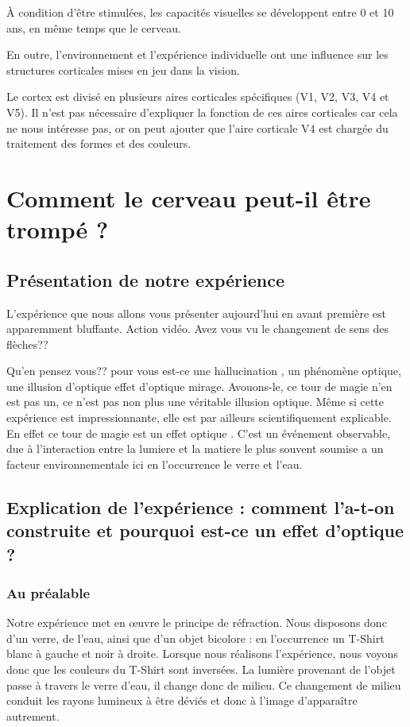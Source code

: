 \documentclass[a4paper, 12pt, onecolumn, openany]{report}
\begin{document}
	À condition d'être stimulées, les capacités visuelles se développent entre 0 et 10 ans, en même temps que le cerveau.
	
	En outre, l'environnement et l'expérience individuelle ont une influence sur les structures corticales mises en jeu dans la vision.
	
	Le cortex est divisé en plusieurs aires corticales spécifiques (V1, V2, V3, V4 et V5). Il n'est pas nécessaire d'expliquer la fonction de ces aires corticales car cela ne nous intéresse pas, or on peut ajouter que l'aire corticale V4 est chargée du traitement des formes et des couleurs.

\chapter{Comment le cerveau peut-il être trompé ?}
	\section{Présentation de notre expérience}
	L'expérience que nous allons vous présenter aujourd'hui en avant première est apparemment bluffante. Action vidéo.
	Avez vous vu le changement de sens des flèches?? 
	
	Qu'en pensez vous?? pour vous est-ce une hallucination , un phénomène optique, une illusion d'optique effet d'optique mirage.
Avouons-le, ce tour de magie n'en est pas un, ce n'est pas non plus une véritable illusion optique. 
Même si cette expérience est impressionnante, elle est par ailleurs scientifiquement explicable. En effet ce tour de magie est  un effet optique .  C'est un événement observable, due à l'interaction entre la lumiere et la matiere le plus souvent soumise a un facteur environnementale ici en l'occurrence le verre et l'eau.
	\section{Explication de l'expérience : comment l'a-t-on construite et pourquoi est-ce un effet d'optique ?}
	\subsection{Au préalable}
	Notre expérience met en œuvre le principe de réfraction. Nous disposons donc d'un verre, de l'eau, ainsi que d'un objet bicolore : en l'occurrence un T-Shirt blanc à gauche et noir à droite. Lorsque nous réalisons l'expérience, nous voyons donc que les couleurs du T-Shirt sont inversées. La lumière provenant de l'objet passe à travers le verre d'eau, il change donc de milieu. Ce changement de milieu conduit les rayons lumineux à être déviés et donc à l'image d'apparaître autrement. 
	
\end{document}

